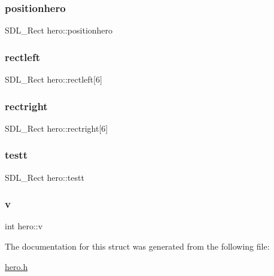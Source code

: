 \mbox{\label{structhero_ac00c690d14ead4118a92d604f8885761}} 
\subsubsection{\texorpdfstring{positionhero}{positionhero}}
{\footnotesize\ttfamily S\+D\+L\+\_\+\+Rect hero\+::positionhero}

\mbox{\label{structhero_aac84e4428f223985f0c57f83ef7e5e56}} 
\subsubsection{\texorpdfstring{rectleft}{rectleft}}
{\footnotesize\ttfamily S\+D\+L\+\_\+\+Rect hero\+::rectleft\mbox{[}6\mbox{]}}

\mbox{\label{structhero_a696a0a143c37c32c2cf037464a103f22}} 
\subsubsection{\texorpdfstring{rectright}{rectright}}
{\footnotesize\ttfamily S\+D\+L\+\_\+\+Rect hero\+::rectright\mbox{[}6\mbox{]}}

\mbox{\label{structhero_a5087f6cc23af7165275189406050fce5}} 
\subsubsection{\texorpdfstring{testt}{testt}}
{\footnotesize\ttfamily S\+D\+L\+\_\+\+Rect hero\+::testt}

\mbox{\label{structhero_a42f83a5a147475aa2fa73a5ff07d2e89}} 
\subsubsection{\texorpdfstring{v}{v}}
{\footnotesize\ttfamily int hero\+::v}



The documentation for this struct was generated from the following file\+:\begin{DoxyCompactItemize}
\item 
\hyperlink{hero_8h}{hero.\+h}\end{DoxyCompactItemize}
